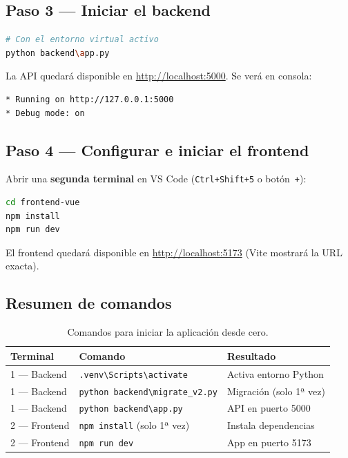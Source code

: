 \documentclass[12pt,a4paper]{article}
\begin{document}
\subsection{Paso 3 — Iniciar el backend}

\begin{lstlisting}[language=bash]
# Con el entorno virtual activo
python backend\app.py
\end{lstlisting}

La API quedará disponible en \url{http://localhost:5000}. Se verá en consola:

\begin{lstlisting}
* Running on http://127.0.0.1:5000
* Debug mode: on
\end{lstlisting}

\subsection{Paso 4 — Configurar e iniciar el frontend}

Abrir una \textbf{segunda terminal} en VS Code (\texttt{Ctrl+Shift+5} o botón~\texttt{+}):

\begin{lstlisting}[language=bash]
cd frontend-vue
npm install
npm run dev
\end{lstlisting}

El frontend quedará disponible en \url{http://localhost:5173} (Vite mostrará la URL exacta).

\subsection{Resumen de comandos}

\begin{table}[H]
\centering
\renewcommand{\arraystretch}{1.3}
\begin{tabular}{lll}
\toprule
\textbf{Terminal} & \textbf{Comando} & \textbf{Resultado} \\
\midrule
1 — Backend & \texttt{.venv\textbackslash Scripts\textbackslash activate} & Activa entorno Python \\
1 — Backend & \texttt{python backend\textbackslash migrate\_v2.py} & Migración (solo 1ª vez) \\
1 — Backend & \texttt{python backend\textbackslash app.py} & API en puerto 5000 \\
2 — Frontend & \texttt{npm install} (solo 1ª vez) & Instala dependencias \\
2 — Frontend & \texttt{npm run dev} & App en puerto 5173 \\
\bottomrule
\end{tabular}
\caption{Comandos para iniciar la aplicación desde cero.}
\end{table}
\end{document}
